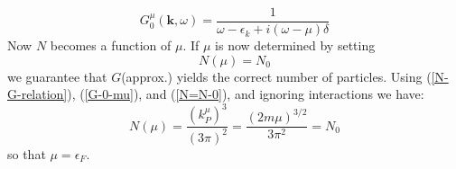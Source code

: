 \begin{equation}G_{0}^{\mu}(\mathbf{k}, \omega)=\frac{1}{\omega-\epsilon_{k}+i(\omega-\mu) \delta}
\label{G-0-mu}
\end{equation}
Now $N$ becomes a function of $\mu$. If $\mu$ is now determined by setting
\begin{equation}
N(\mu)=N_0
\label{N=N-0}
\end{equation}
we guarantee that $G$(approx.) yields the correct number of particles. Using (\ref{N-G-relation}), (\ref{G-0-mu}), and (\ref{N=N-0}), and ignoring interactions we have:
\begin{equation}N(\mu)=\frac{\left(k_{P}^{\mu}\right)^{3}}{(3 \pi)^{2}}=\frac{(2 m \mu)^{3/2}}{3 \pi^{2}}=N_{0}
\label{N0-kF-relation}
\end{equation}
so that $\mu=\epsilon_F$.
